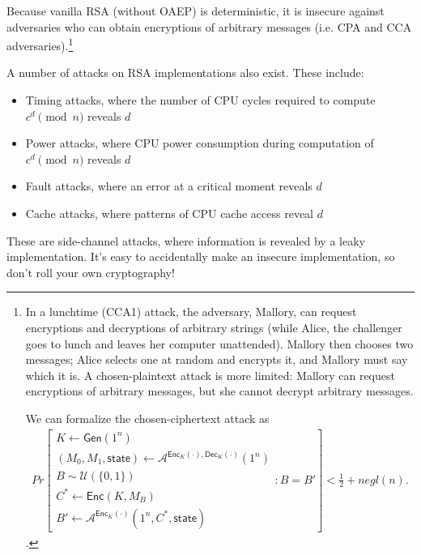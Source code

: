 \documentclass[10pt]{article}
\begin{document}
Because vanilla RSA (without OAEP) is deterministic, it is insecure against adversaries who can obtain encryptions of arbitrary messages (i.e. CPA and CCA adversaries).\footnote{
In a lunchtime (CCA1) attack, the adversary, Mallory, can request encryptions and decryptions of arbitrary strings (while Alice, the challenger goes to lunch and leaves her computer unattended). Mallory then chooses two messages; Alice selects one at random and encrypts it, and Mallory must say which it is. A chosen-plaintext attack is more limited: Mallory can request encryptions of arbitrary messages, but she cannot decrypt arbitrary messages. 

We can formalize the chosen-ciphertext attack as
\begin{align}
  Pr \left[
  \begin{array}{l}
    K \leftarrow \textsf{Gen}(1^n) \\
    (M_0, M_1, \textsf{state}) \leftarrow \mathcal A^{\textsf{Enc}_K(\cdot),\textsf{Dec}_K(\cdot)}(1^n) \\
    B \sim \mathcal U(\{0,1\}) \\
    C^* \leftarrow \textsf{Enc}(K,M_B) \\
    B' \leftarrow \mathcal A^{\textsf{Enc}_K(\cdot)}(1^n,C^*,\textsf{state})
  \end{array}
  : B = B'
  \right]
  < \frac{1}{2} + negl(n).
\end{align}.}

A number of attacks on RSA implementations also exist. These include:
\begin{itemize}
	\item Timing attacks, where the number of CPU cycles required to compute $c^d \pmod n$ reveals $d$
	\item Power attacks, where CPU power consumption during computation of $c^d \pmod n$ reveals $d$
	\item Fault attacks, where an error at a critical moment reveals $d$
	\item Cache attacks, where patterns of CPU cache access reveal $d$
\end{itemize}

These are side-channel attacks, where information is revealed by a leaky implementation. It's easy to accidentally make an insecure implementation, so don't roll your own cryptography!
\end{document}
